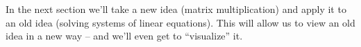 In the next section we'll take a new idea (matrix multiplication) and apply it to an old idea (solving systems of linear equations). This will allow us to view an old idea in a new way -- and we'll even get to ``visualize'' it.\\

 
 


